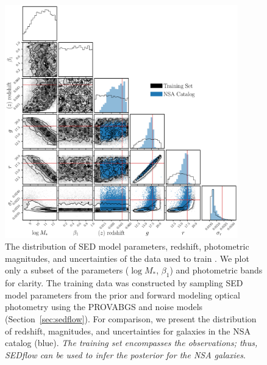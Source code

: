 \begin{figure}
\begin{center}
\includegraphics[width=0.9\textwidth]{figs/training.pdf}
    \caption{\label{fig:data}
    The distribution of SED model parameters, redshift, photometric
    magnitudes, and uncertainties of the data used to train \sedflow.
    We plot only a subset of the parameters ($\log M_*$, $\beta_1$) and
    photometric bands for clarity.
    The training data was constructed by sampling SED model parameters from the
    prior and forward modeling optical photometry using the PROVABGS and noise
    models (Section~\ref{sec:sedflow}). 
    For comparison, we present the distribution of redshift, magnitudes, and
    uncertainties for galaxies in the NSA catalog (blue). 
    \emph{The training set encompasses the observations; thus, {\sc SEDflow}
    can be used to infer the posterior for the NSA galaxies}.
    }
\end{center}
\end{figure}
